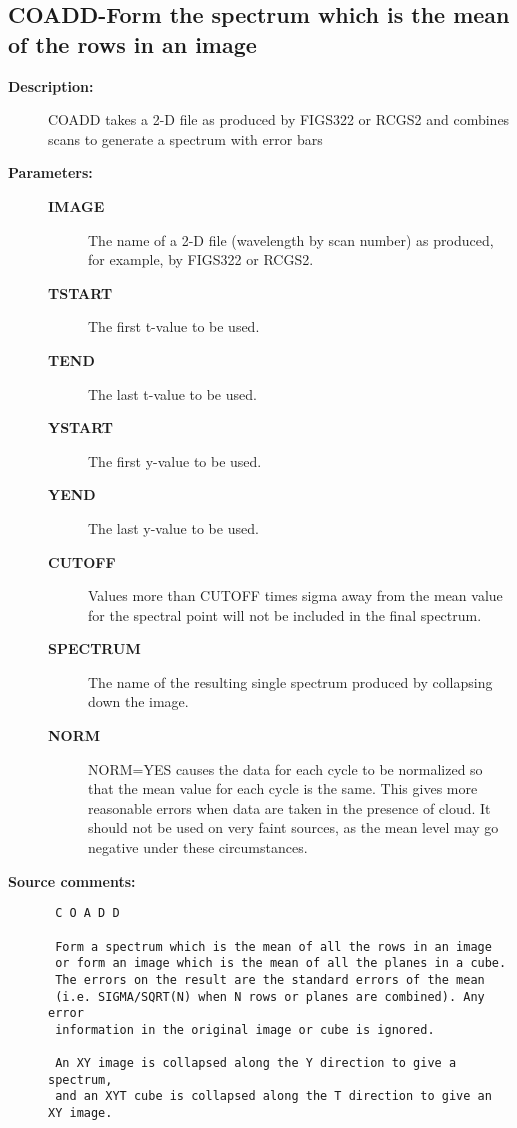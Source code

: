 \subsection{COADD-\label{COADD}Form the spectrum which is the mean of the rows in an image}
\begin{description}

\item [{\bf Description:}]
 COADD takes a 2-D file as produced by FIGS322 or RCGS2 and combines
 scans to generate a spectrum with error bars

\item [{\bf Parameters:}]
\begin{description}
\item [{\bf IMAGE}]
 The name of a 2-D file (wavelength by scan number) as
 produced, for example, by FIGS322 or RCGS2.
\item [{\bf TSTART}]
 The first t-value to be used.
\item [{\bf TEND}]
 The last t-value to be used.
\item [{\bf YSTART}]
 The first y-value to be used.
\item [{\bf YEND}]
 The last y-value to be used.
\item [{\bf CUTOFF}]
 Values more than CUTOFF times sigma away from the mean
 value for the spectral point will not be included in
 the final spectrum.
\item [{\bf SPECTRUM}]
 The name of the resulting single spectrum produced
 by collapsing down the image.
\item [{\bf NORM}]
 NORM=YES causes the data for each cycle to be
 normalized so that the mean value for each cycle
 is the same. This gives more reasonable errors when
 data are taken in the presence of cloud. It should
 not be used on very faint sources, as the mean level
 may go negative under these circumstances.
\end{description}

\item [{\bf Source comments:}]
\begin{verbatim}
 C O A D D

 Form a spectrum which is the mean of all the rows in an image
 or form an image which is the mean of all the planes in a cube.
 The errors on the result are the standard errors of the mean
 (i.e. SIGMA/SQRT(N) when N rows or planes are combined). Any error
 information in the original image or cube is ignored.

 An XY image is collapsed along the Y direction to give a spectrum,
 and an XYT cube is collapsed along the T direction to give an XY image.


\end{verbatim}
\end{description}
